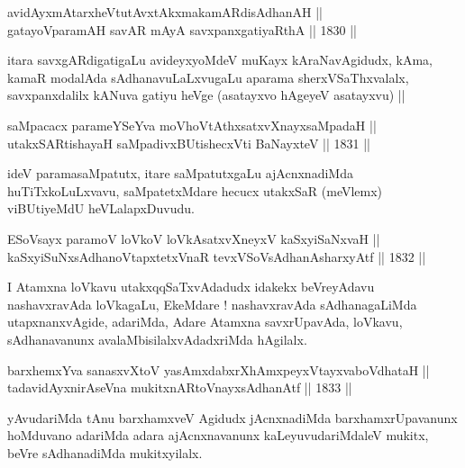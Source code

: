 \begin{shl}
avidAyxmAtarxheVtutAvxtAkxmakamARdisAdhanAH || \\
gatayoV\s paramAH savAR mAyA savxpanxgatiyaRthA \hfill || 1830 ||  
\end{shl}

\begin{artha}
itara savxgARdigatigaLu avideyxyoMdeV muKayx kAraNavAgidudx, kAma,
kamaR modalAda sAdhanavuLaLxvugaLu aparama sherxVSaThxvalalx,
savxpanxdalilx kANuva gatiyu heVge (asatayxvo hAgeyeV asatayxvu) ||
\end{artha}

\begin{shl}
saMpacacx parameYSeYva moVhoVtAthxsatxvXnayxsaMpadaH || \\
utakxSARtishayaH saMpadivxBUtishecxVti BaNayxteV \hfill || 1831 ||  
\end{shl}

\begin{artha}
ideV paramasaMpatutx, itare saMpatutxgaLu ajAcnxnadiMda
huTiTxkoLuLxvavu, saMpatetxMdare hecucx utakxSaR (meVlemx) viBUtiyeMdU
heVLalapxDuvudu.
\end{artha}


\begin{shl}
ESoV\s sayx paramoV loVkoV loVkAsatxvXneyxV kaSxyiSaNxvaH || \\
kaSxyiSuNxsAdhanoVtapxtetxVnaR tevxVSoV\s sAdhanAsharxyAtf \hfill || 1832 ||  
\end{shl}

\begin{artha}
I Atamxna loVkavu utakxqqSaTxvAdadudx idakekx beVreyAdavu
nashavxravAda loVkagaLu, EkeMdare ! nashavxravAda sAdhanagaLiMda
utapxnanxvAgide, adariMda, Adare Atamxna savxrUpavAda, loVkavu,
sAdhanavanunx avalaMbisilalxvAdadxriMda hAgilalx.
\end{artha}

\begin{shl}
barxhemxYva sanasxvXtoV yasAmxdabxrXhAmxpeyxVtayxvaboVdhataH || \\
tadavidAyxnirAseVna mukitxnARtoV\s nayxsAdhanAtf \hfill || 1833 ||  
\end{shl}

\begin{artha}
yAvudariMda tAnu barxhamxveV Agidudx jAcnxnadiMda barxhamxrUpavanunx
hoMduvano adariMda adara ajAcnxnavanunx kaLeyuvudariMdaleV mukitx,
beVre sAdhanadiMda mukitxyilalx.
\end{artha}


